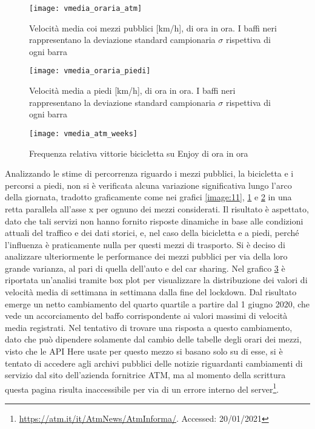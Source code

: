 \begin{figure}[H]
	\texttt{[image: vmedia\_oraria\_atm]}
	\caption{Velocità media coi mezzi pubblici [km/h], di ora in ora. I baffi neri rappresentano la deviazione standard campionaria $\sigma$ rispettiva di ogni barra}
	\label{image:17}
\end{figure}

\begin{figure}[H]
	\texttt{[image: vmedia\_oraria\_piedi]}
	\caption{Velocità media a piedi [km/h], di ora in ora. I baffi neri rappresentano la deviazione standard campionaria $\sigma$ rispettiva di ogni barra}
	\label{image:18}
\end{figure}

\begin{figure}[H]
	\texttt{[image: vmedia\_atm\_weeks]}
	\caption{Frequenza relativa vittorie bicicletta su Enjoy di ora in ora}
	\label{image:29}
\end{figure}

Analizzando le stime di percorrenza riguardo i mezzi pubblici, la bicicletta e i percorsi a piedi, non si è verificata alcuna variazione significativa lungo l'arco della giornata, tradotto graficamente come nei grafici \ref{image:11}, \ref{image:17} e \ref{image:18} in una retta parallela all'asse x per ognuno dei mezzi considerati. Il risultato è aspettato, dato che tali servizi non hanno fornito risposte dinamiche in base alle condizioni attuali del traffico e dei dati storici, e, nel caso della bicicletta e a piedi, perché l'influenza è praticamente nulla per questi mezzi di trasporto. Si è deciso di analizzare ulteriormente le performance dei mezzi pubblici per via della loro grande varianza, al pari di quella dell'auto e del car sharing. Nel grafico \ref{image:29} è riportata un'analisi tramite box plot per visualizzare la distribuzione dei valori di velocità media di settimana in settimana dalla fine del lockdown. Dal risultato emerge un netto cambiamento del quarto quartile a partire dal 1 giugno 2020, che vede un accorciamento del baffo corrispondente ai valori massimi di velocità media registrati. Nel tentativo di trovare una risposta a questo cambiamento, dato che può dipendere solamente dal cambio delle tabelle degli orari dei mezzi, visto che le API Here usate per questo mezzo si basano solo su di esse, si è tentato di accedere agli archivi pubblici delle notizie riguardanti cambiamenti di servizio dal sito dell'azienda fornitrice ATM, ma al momento della scrittura questa pagina risulta inaccessibile per via di un errore interno del server\footnote{\url{https://atm.it/it/AtmNews/AtmInforma/}. Accessed: 20/01/2021}.

